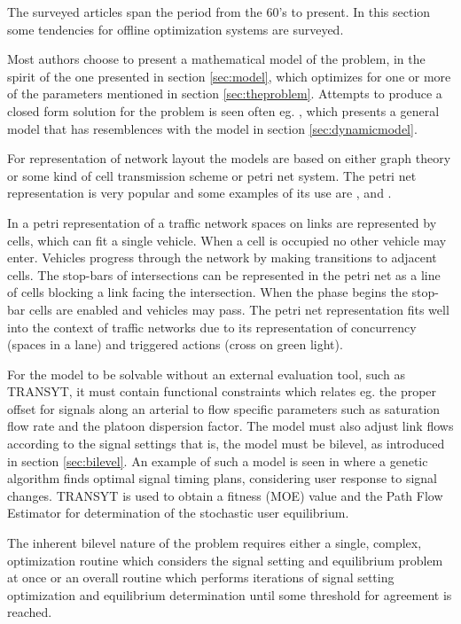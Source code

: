 \label{sec:offline}

The surveyed articles span the period from the 60's to present. In
this section some tendencies for offline optimization systems are
surveyed.

Most authors choose to present a mathematical model of the problem, in
the spirit of the one presented in section \ref{sec:model}, which
optimizes for one or more of the parameters mentioned in section
\ref{sec:theproblem}. Attempts to produce a closed form solution for the
problem is seen often eg. \cite{36}, which presents a general model
that has resemblences with the model in section \ref{sec:dynamicmodel}.

For representation of network layout the models are based on either
graph theory or some kind of cell transmission scheme or petri net
system. The petri net representation is very popular and some examples
of its use are \cite{12}, \cite{16} and \cite{petri}.

In a petri representation of a traffic network spaces on links are
represented by cells, which can fit a single vehicle. When a cell is
occupied no other vehicle may enter. Vehicles progress through the
network by making transitions to adjacent cells. The stop-bars of
intersections can be represented in the petri net as a line of cells
blocking a link facing the intersection. When the phase begins the
stop-bar cells are enabled and vehicles may pass.  The petri net
representation fits well into the context of traffic networks due to
its representation of concurrency (spaces in a lane) and triggered
actions (cross on green light).

For the model to be solvable without an external evaluation tool, such
as TRANSYT, it must contain functional constraints which relates
eg. the proper offset for signals along an arterial to flow specific
parameters such as saturation flow rate and the platoon dispersion
factor.  The model must also adjust link flows according to the signal
settings that is, the model must be bilevel, as introduced in section
\ref{sec:bilevel}. An example of such a model is seen in \cite{33} where a
genetic algorithm finds optimal signal timing plans, considering user
response to signal changes. TRANSYT is used to obtain a fitness (MOE)
value and the Path Flow Estimator for determination of the stochastic
user equilibrium.

The inherent bilevel nature of the problem requires either a single,
complex, optimization routine which considers the signal setting and
equilibrium problem at once or an overall routine which performs
iterations of signal setting optimization and equilibrium
determination until some threshold for agreement is reached.

